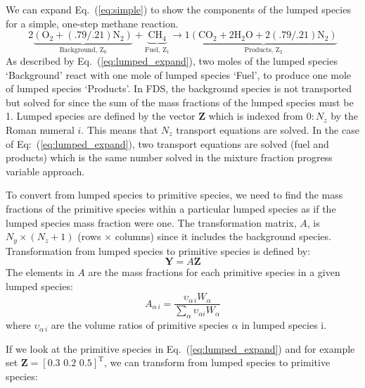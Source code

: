 We can expand Eq.~(\ref{eq:simple}) to show the components of the lumped species for a simple, one-step methane reaction. 
\begin{equation}\label{eq:lumped_expand}
\mathrm{2\underbrace{(\mbox{O}_2+(.79/.21)\mbox{N}_2)}_\text{Background,~Z$_0$}+\underbrace{\mbox{CH}_4}_\text{Fuel,~Z$_1$} \rightarrow 1\underbrace{(\mbox{CO}_2+2\mbox{H}_2\mbox{O}+2(.79/.21)\mbox{N}_2)}_\text{Products,~Z$_2$}}
\end{equation}
As described by Eq.~(\ref{eq:lumped_expand}), two moles of the lumped species `Background' react with one mole of lumped species `Fuel', to produce one mole of lumped species `Products'. In FDS, the background species is not transported but solved for since the sum of the mass fractions of the lumped species must be 1. Lumped species are defined by the vector $\textbf{Z}$ which is indexed from $0:N_{z}$ by the Roman numeral $i$. This means that $N_{z}$ transport equations are solved. In the case of Eq:~(\ref{eq:lumped_expand}), two transport equations are solved (fuel and products) which is the same number solved in the mixture fraction progress variable approach.

To convert from lumped species to primitive species, we need to find the mass fractions of the primitive species within a particular lumped species as if the lumped species mass fraction were one. The transformation matrix, $A$, is $N_{y} \times (N_{z}+1)$ (rows $\times$ columns) since it includes the background species. Transformation from lumped species to primitive species is defined by: 
\begin{equation}\label{eq:transform}
\textbf{Y}=A\textbf{Z} 
\end{equation}
The elements in $A$ are the mass fractions for each primitive species in a given lumped species:
\begin{equation}\label{eq:A_def}
A_{\alpha\,i} = \frac{\upsilon_{\alpha\,i}W_{\alpha}}{\displaystyle \sum_{\alpha}\upsilon_{\alpha i}W_{\alpha}}
\end{equation}
where $\upsilon_{\alpha\,i}$ are the volume ratios of primitive species $\alpha$ in lumped species {i}.

If we look at the primitive species in Eq.~(\ref{eq:lumped_expand}) and for example set $\mathbf{Z} = [0.3\, \, 0.2\, \, 0.5]^\mathrm{T}$, we can transform from lumped species to primitive species:

